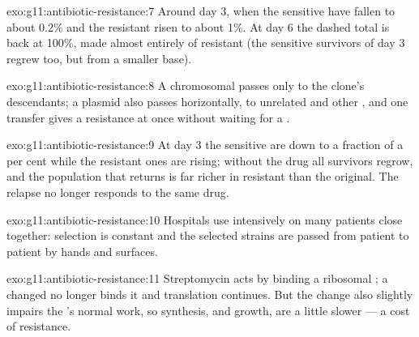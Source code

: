 \begin{solution}{exo:g11:antibiotic-resistance:7}
Around day 3, when the sensitive  have fallen to about 0.2\% and
the resistant risen to about 1\%. At day 6 the dashed total is back at
100\%, made almost entirely of resistant  (the sensitive
survivors of day 3 regrew too, but from a smaller base).
\end{solution}

\begin{solution}{exo:g11:antibiotic-resistance:8}
A chromosomal  passes only to the clone's descendants; a plasmid
also passes horizontally, to unrelated  and other , and
one transfer gives a  resistance at once without waiting for a
.
\end{solution}

\begin{solution}{exo:g11:antibiotic-resistance:9}
At day 3 the sensitive  are down to a fraction of a per cent
while the resistant ones are rising; without the drug all survivors
regrow, and the population that returns is far richer in resistant
 than the original. The relapse no longer responds to the same
drug.
\end{solution}

\begin{solution}{exo:g11:antibiotic-resistance:10}
Hospitals use  intensively on many patients close
together: selection is constant and the selected strains are passed
from patient to patient by hands and surfaces.
\end{solution}

\begin{solution}{exo:g11:antibiotic-resistance:11}
Streptomycin acts by binding a ribosomal ; a changed  no
longer binds it and translation continues. But the change also
slightly impairs the 's normal work, so  synthesis, and
growth, are a little slower --- a cost of resistance.
\end{solution}

